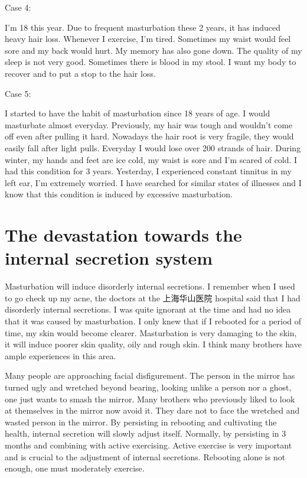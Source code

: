 \documentclass[
]{book}
\begin{document}
Case 4:

I'm 18 this year. Due to frequent masturbation these 2 years, it has induced heavy hair loss. Whenever I exercise, I'm tired. Sometimes my waist would feel sore and my back would hurt. My memory has also gone down. The quality of my sleep is not very good. Sometimes there is blood in my stool. I want my body to recover and to put a stop to the hair loss.

Case 5:

I started to have the habit of masturbation since 18 years of age. I would masturbate almost everyday. Previously, my hair was tough and wouldn't come off even after pulling it hard. Nowadays the hair root is very fragile, they would easily fall after light pulls. Everyday I would lose over 200 strands of hair. During winter, my hands and feet are ice cold, my waist is sore and I'm scared of cold. I had this condition for 3 years. Yesterday, I experienced constant tinnitus in my left ear, I'm extremely worried. I have searched for similar states of illnesses and I know that this condition is induced by excessive masturbation.

\hypertarget{the-devastation-towards-the-internal-secretion-system}{%
\section{The devastation towards the internal secretion system}\label{the-devastation-towards-the-internal-secretion-system}}

Masturbation will induce disorderly internal secretions. I remember when I used to go check up my acne, the doctors at the 上海华山医院 hospital said that I had disorderly internal secretions. I was quite ignorant at the time and had no idea that it was caused by masturbation. I only knew that if I rebooted for a period of time, my skin would become clearer. Masturbation is very damaging to the skin, it will induce poorer skin quality, oily and rough skin. I think many brothers have ample experiences in this area.

Many people are approaching facial disfigurement. The person in the mirror has turned ugly and wretched beyond bearing, looking unlike a person nor a ghost, one just wants to smash the mirror. Many brothers who previously liked to look at themselves in the mirror now avoid it. They dare not to face the wretched and wasted person in the mirror. By persisting in rebooting and cultivating the health, internal secretion will slowly adjust itself. Normally, by persisting in 3 months and combining with active exercising. Active exercise is very important and is crucial to the adjustment of internal secretions. Rebooting alone is not enough, one must moderately exercise.
\end{document}
